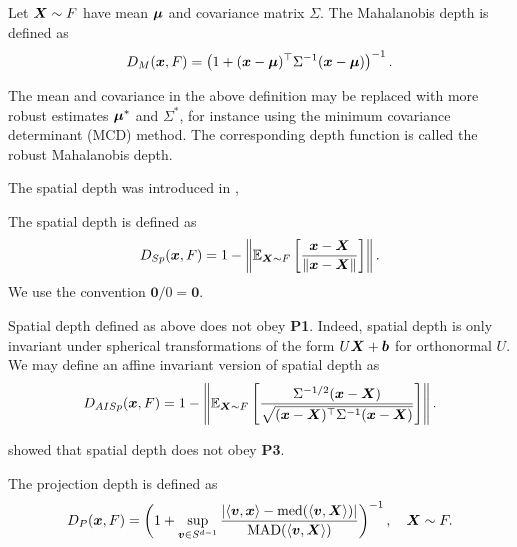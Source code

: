 \begin{definition}
    Let $\bm{X} \sim F$ have mean $\bm{\mu}$ and covariance matrix $\Sigma$.
    The Mahalanobis depth is defined as
    \begin{equation}
        D_{M}(\bm{x}, F) = \left(1 + (\bm{x} - \bm{\mu})^\top \Sigma^{-1}(\bm{x} - \bm{\mu})\right)^{-1}.
    \end{equation}
\end{definition}

\begin{remark}
    The mean and covariance in the above definition may be replaced with more
    robust estimates $\bm{\mu}^*$ and $\Sigma^*$, for instance using the minimum
    covariance determinant (MCD) method.
    The corresponding depth function is called the robust Mahalanobis depth.
\end{remark}


The spatial depth was introduced in \textcite{serfling-2002},

\begin{definition} \label{def:spatial_depth}
    The spatial depth is defined as
    \begin{equation}
        D_{Sp}(\bm{x}, F) = 1 - \left\Vert \operatorname{\mathbb{E}}_{\bm{X} \sim F}\left[\frac{\bm{x} - \bm{X}}{\Vert \bm{x} - \bm{X} \Vert}\right] \right\Vert.
    \end{equation}
    We use the convention $\bm0/0 = \bm0$.
\end{definition}

\begin{remark}
    Spatial depth defined as above does not obey \textbf{P1}.
    Indeed, spatial depth is only invariant under spherical transformations of
    the form $U\bm{X} + \bm{b}$ for orthonormal $U$.
    We may define an affine invariant version of spatial depth as
    \begin{equation}
        D_{AISp}(\bm{x}, F) = 1 - \left\Vert \operatorname{\mathbb{E}}_{\bm{X} \sim F}\left[\frac{\Sigma^{-1/2}(\bm{x} - \bm{X})}{\sqrt{(\bm{x} - \bm{X})^\top\Sigma^{-1}(\bm{x} - \bm{X})}}\right] \right\Vert.
    \end{equation}
\end{remark}

\begin{remark}
    \textcite{nagy-2017} showed that spatial depth does not obey \textbf{P3}.
\end{remark}


\begin{definition}
    The projection depth is defined as
    \begin{equation}
        D_P(\bm{x}, F) = \left(1 + \sup_{\bm{v} \in S^{d - 1}} \frac{|\langle \bm{v}, \bm{x} \rangle - \operatorname{med}(\langle \bm{v}, \bm{X} \rangle)|}{\operatorname{MAD}(\langle \bm{v}, \bm{X} \rangle)}\right)^{-1}, \quad
        \bm{X} \sim F.
    \end{equation}
\end{definition}


